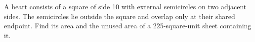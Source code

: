A heart consists of a square of side 10 with external semicircles on two adjacent sides. The semicircles lie outside the square and overlap only at their shared endpoint. Find its area and the unused area of a 225-square-unit sheet containing it.
